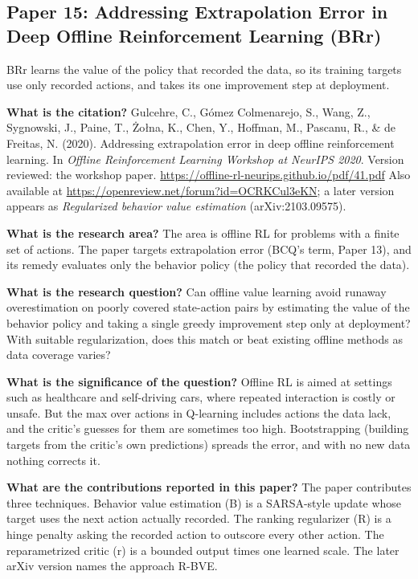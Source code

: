 \documentclass[11pt]{article}
\newcommand{\paper}[1]{\subsection*{#1}}
\newcommand{\q}[2]{\item \textbf{#1} #2}
\begin{document}
\paper{Paper 15: Addressing Extrapolation Error in Deep Offline Reinforcement Learning (BRr)}
BRr learns the value of the policy that recorded the data, so its training targets use only recorded actions, and takes its one improvement step at deployment.
\begin{qna}

\q{What is the citation?}
Gulcehre, C., G\'{o}mez Colmenarejo, S., Wang, Z., Sygnowski, J., Paine, T., \.{Z}o{\l}na, K., Chen, Y., Hoffman, M., Pascanu, R., \& de Freitas, N. (2020). Addressing extrapolation error in deep offline reinforcement learning. In \emph{Offline Reinforcement Learning Workshop at NeurIPS 2020}. Version reviewed: the workshop paper. \url{https://offline-rl-neurips.github.io/pdf/41.pdf} Also available at \url{https://openreview.net/forum?id=OCRKCul3eKN}; a later version appears as \emph{Regularized behavior value estimation} (arXiv:2103.09575).

\q{What is the research area?}
The area is offline RL for problems with a finite set of actions. The paper targets extrapolation error (BCQ's term, Paper 13), and its remedy evaluates only the behavior policy (the policy that recorded the data).

\q{What is the research question?}
Can offline value learning avoid runaway overestimation on poorly covered state-action pairs by estimating the value of the behavior policy and taking a single greedy improvement step only at deployment? With suitable regularization, does this match or beat existing offline methods as data coverage varies?

\q{What is the significance of the question?}
Offline RL is aimed at settings such as healthcare and self-driving cars, where repeated interaction is costly or unsafe. But the max over actions in Q-learning includes actions the data lack, and the critic's guesses for them are sometimes too high. Bootstrapping (building targets from the critic's own predictions) spreads the error, and with no new data nothing corrects it.

\q{What are the contributions reported in this paper?}
The paper contributes three techniques. Behavior value estimation (B) is a SARSA-style update whose target uses the next action actually recorded. The ranking regularizer (R) is a hinge penalty asking the recorded action to outscore every other action. The reparametrized critic (r) is a bounded output times one learned scale. The later arXiv version names the approach R-BVE.


\end{qna}
\end{document}
